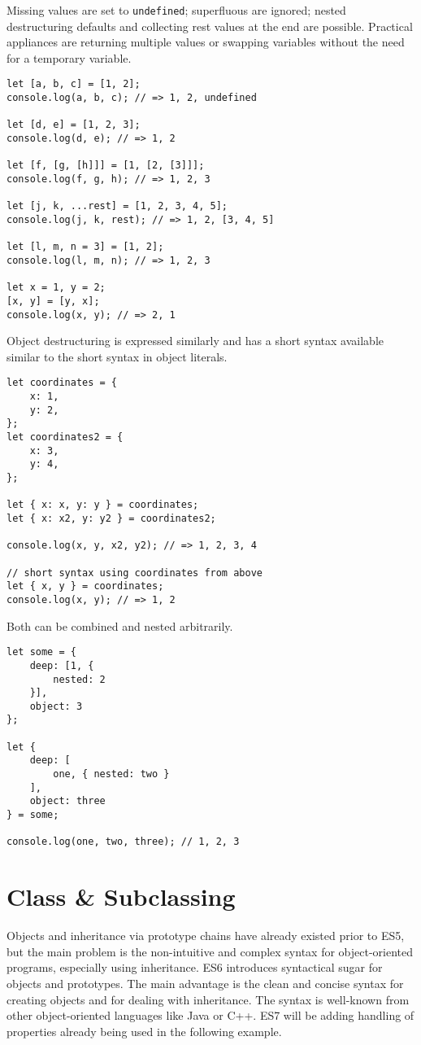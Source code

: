 \documentclass{bioinfo}
\begin{document}
Missing values are set to {\tt undefined}; superfluous are ignored; nested destructuring
defaults and collecting rest values at the end are possible.
Practical appliances are returning multiple values or swapping variables
without the need for a temporary variable.

\vfill\break

\begin{lstlisting}
let [a, b, c] = [1, 2];
console.log(a, b, c); // => 1, 2, undefined

let [d, e] = [1, 2, 3];
console.log(d, e); // => 1, 2

let [f, [g, [h]]] = [1, [2, [3]]];
console.log(f, g, h); // => 1, 2, 3

let [j, k, ...rest] = [1, 2, 3, 4, 5];
console.log(j, k, rest); // => 1, 2, [3, 4, 5]

let [l, m, n = 3] = [1, 2];
console.log(l, m, n); // => 1, 2, 3

let x = 1, y = 2;
[x, y] = [y, x];
console.log(x, y); // => 2, 1
\end{lstlisting}

Object destructuring is expressed similarly and has a short syntax available
similar to the short syntax in object literals.
\begin{lstlisting}
let coordinates = {
    x: 1,
    y: 2,
};
let coordinates2 = {
    x: 3,
    y: 4,
};

let { x: x, y: y } = coordinates;
let { x: x2, y: y2 } = coordinates2;

console.log(x, y, x2, y2); // => 1, 2, 3, 4

// short syntax using coordinates from above
let { x, y } = coordinates;
console.log(x, y); // => 1, 2
\end{lstlisting}

Both can be combined and nested arbitrarily.

\begin{lstlisting}
let some = {
    deep: [1, {
        nested: 2
    }],
    object: 3
};

let {
    deep: [
        one, { nested: two }
    ],
    object: three
} = some;

console.log(one, two, three); // 1, 2, 3
\end{lstlisting}

\section{Class \& Subclassing}
Objects and inheritance via prototype chains have already existed prior to ES5,
but the main problem is the non-intuitive and complex syntax for object-oriented
programs, especially using inheritance. ES6 introduces syntactical sugar for
objects and prototypes. The main advantage is the clean and concise syntax
for creating objects and for dealing with inheritance. The syntax is well-known
from other object-oriented languages like Java or C++. ES7 will be adding
handling of properties already being used in the following example.
\end{document}

